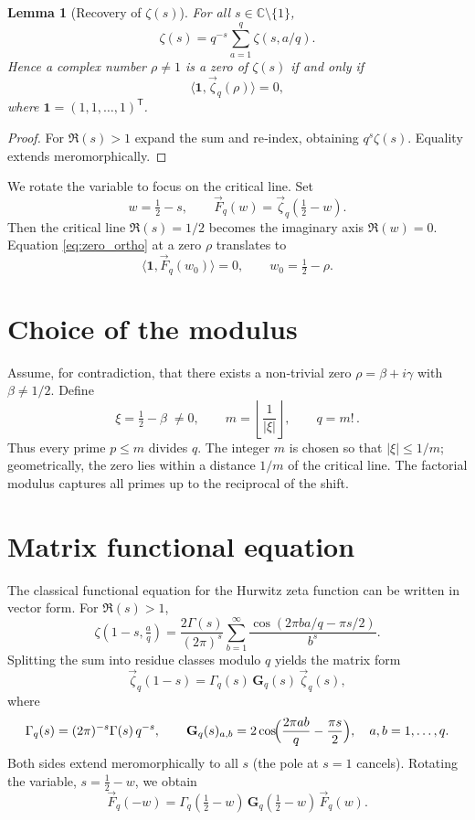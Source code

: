 \documentclass[12pt,a4paper]{article}
\newtheorem{lemma}[theorem]{Lemma}
\theoremstyle{definition}
\begin{document}
\begin{lemma}[Recovery of \(\zeta(s)\)]\label{lem:recovery}
For all \(s\in\mathbb{C}\setminus\{1\}\),
\[
\zeta(s) = q^{-s} \sum_{a=1}^q \zeta(s,a/q).
\]
Hence a complex number \(\rho\neq 1\) is a zero of \(\zeta(s)\) if and only if
\begin{equation}\label{eq:zero_ortho}
\langle \mathbf{1}, \vec{\zeta}_q(\rho) \rangle = 0,
\end{equation}
where \(\mathbf{1}=(1,1,\dots,1)^{\mathsf T}\).
\end{lemma}

\begin{proof}
For \(\Re(s)>1\) expand the sum and re‑index, obtaining \(q^{s}\zeta(s)\).  Equality extends meromorphically.
\end{proof}

We rotate the variable to focus on the critical line.  Set
\[
w = \tfrac12 - s,\qquad \vec{F}_q(w) = \vec{\zeta}_q(\tfrac12 - w).
\]
Then the critical line \(\Re(s)=1/2\) becomes the imaginary axis \(\Re(w)=0\).  Equation \eqref{eq:zero_ortho} at a zero \(\rho\) translates to
\[
\langle \mathbf{1}, \vec{F}_q(w_0) \rangle = 0,\qquad w_0 = \tfrac12 - \rho.
\]

\section{Choice of the modulus}

Assume, for contradiction, that there exists a non‑trivial zero \(\rho = \beta + i\gamma\) with \(\beta \neq 1/2\).  Define
\[
\xi = \tfrac12 - \beta \;\neq 0,\qquad
m = \left\lfloor \frac{1}{|\xi|} \right\rfloor,\qquad
q = m!\,.
\]
Thus every prime \(p\le m\) divides \(q\).  The integer \(m\) is chosen so that \(|\xi| \le 1/m\); geometrically, the zero lies within a distance \(1/m\) of the critical line.  The factorial modulus captures all primes up to the reciprocal of the shift.

\section{Matrix functional equation}

The classical functional equation for the Hurwitz zeta function can be written in vector form.  For \(\Re(s)>1\),
\[
\zeta(1-s, \tfrac{a}{q}) = \frac{2\Gamma(s)}{(2\pi)^s}
          \sum_{b=1}^\infty \frac{\cos(2\pi b a/q - \pi s/2)}{b^{s}}.
\]
Splitting the sum into residue classes modulo \(q\) yields the matrix form
\begin{equation}\label{eq:HFE}
\vec{\zeta}_q(1-s) = \Gamma_q(s)\,\mathbf{G}_q(s)\,\vec{\zeta}_q(s),
\end{equation}
where
\[
\Gamma_q(s) = (2\pi)^{-s}\Gamma(s)\,q^{-s},
\qquad
\mathbf{G}_q(s)_{a,b} = 2\cos\!\Bigl(\frac{2\pi a b}{q} - \frac{\pi s}{2}\Bigr),
\quad a,b=1,\dots,q.
\]
Both sides extend meromorphically to all \(s\) (the pole at \(s=1\) cancels).  
Rotating the variable, \(s=\tfrac12-w\), we obtain
\begin{equation}\label{eq:Ffeq}
\vec{F}_q(-w) = \Gamma_q(\tfrac12-w)\,\mathbf{G}_q(\tfrac12-w)\,\vec{F}_q(w).
\end{equation}
\end{document}
